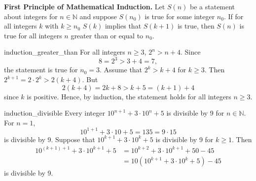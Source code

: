 \noindent
{\bf First Principle of Mathematical Induction.} 
Let $S(n)$ be a statement about integers for  $n \in {\mathbb N}$ and suppose $S(n_0)$ is true for some integer $n_0$.  If for all integers $k$ with $k \geq n_0$ $S(k)$ implies that $S(k+1)$ is true, then $S(n)$ is true for all integers $n$ greater than or equal to $n_0$.  


\begin{example}{induction_greater_than}
For all integers $n \geq 3$, $2^n > n + 4$. Since
\[
8 = 2^3 > 3 + 4 = 7,
\]
the statement is true for $n_0 = 3$.  Assume that $2^k > k + 4$ for $k \geq 3$.  Then $2^{k + 1} = 2 \cdot 2^{k} > 2(k + 4)$.  But 
\[
2(k + 4) = 2k + 8 > k + 5 = (k + 1) + 4
\]
since $k$ is positive.  Hence, by induction, the statement holds for all integers $n \geq 3$. 
\end{example}

\begin{example}{induction_divisible}
Every integer $10^{n + 1} + 3 \cdot 10^n + 5$ is divisible by 9 for $n \in {\mathbb N}$.  For $n = 1$, 
\[
10^{1 + 1} + 3 \cdot 10 + 5 = 135 = 9 \cdot 15
\]
is divisible by 9.  Suppose that $10^{k + 1} + 3 \cdot 10^k + 5$ is divisible by 9 for $k \geq 1$.  Then 
\begin{align*}
10^{(k + 1) + 1} + 3 \cdot 10^{k + 1} + 5
& =
10^{k + 2} + 3 \cdot 10^{k + 1} + 50 - 45 \\
& =
10 (10^{k + 1} + 3 \cdot 10^{k} + 5) - 45
\end{align*}
is divisible by 9.
\end{example}

